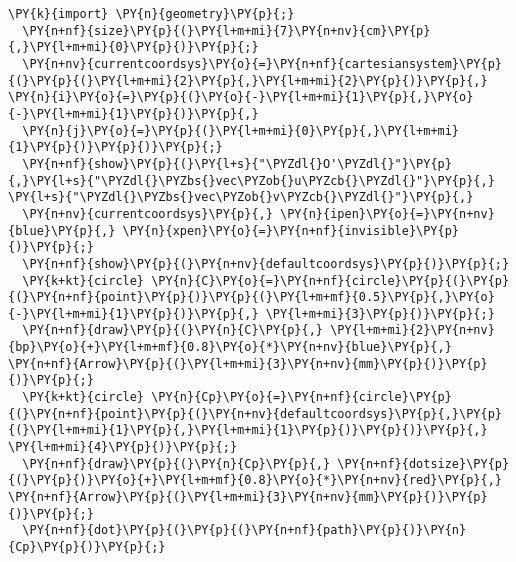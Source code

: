 \begin{Verbatim}[commandchars=\\\{\}]
  \PY{k}{import} \PY{n}{geometry}\PY{p}{;}
  \PY{n+nf}{size}\PY{p}{(}\PY{l+m+mi}{7}\PY{n+nv}{cm}\PY{p}{,}\PY{l+m+mi}{0}\PY{p}{)}\PY{p}{;}
  \PY{n+nv}{currentcoordsys}\PY{o}{=}\PY{n+nf}{cartesiansystem}\PY{p}{(}\PY{p}{(}\PY{l+m+mi}{2}\PY{p}{,}\PY{l+m+mi}{2}\PY{p}{)}\PY{p}{,} \PY{n}{i}\PY{o}{=}\PY{p}{(}\PY{o}{-}\PY{l+m+mi}{1}\PY{p}{,}\PY{o}{-}\PY{l+m+mi}{1}\PY{p}{)}\PY{p}{,}
  \PY{n}{j}\PY{o}{=}\PY{p}{(}\PY{l+m+mi}{0}\PY{p}{,}\PY{l+m+mi}{1}\PY{p}{)}\PY{p}{)}\PY{p}{;}
  \PY{n+nf}{show}\PY{p}{(}\PY{l+s}{"\PYZdl{}O'\PYZdl{}"}\PY{p}{,}\PY{l+s}{"\PYZdl{}\PYZbs{}vec\PYZob{}u\PYZcb{}\PYZdl{}"}\PY{p}{,} \PY{l+s}{"\PYZdl{}\PYZbs{}vec\PYZob{}v\PYZcb{}\PYZdl{}"}\PY{p}{,}
  \PY{n+nv}{currentcoordsys}\PY{p}{,} \PY{n}{ipen}\PY{o}{=}\PY{n+nv}{blue}\PY{p}{,} \PY{n}{xpen}\PY{o}{=}\PY{n+nf}{invisible}\PY{p}{)}\PY{p}{;}
  \PY{n+nf}{show}\PY{p}{(}\PY{n+nv}{defaultcoordsys}\PY{p}{)}\PY{p}{;}
  \PY{k+kt}{circle} \PY{n}{C}\PY{o}{=}\PY{n+nf}{circle}\PY{p}{(}\PY{p}{(}\PY{n+nf}{point}\PY{p}{)}\PY{p}{(}\PY{l+m+mf}{0.5}\PY{p}{,}\PY{o}{-}\PY{l+m+mi}{1}\PY{p}{)}\PY{p}{,} \PY{l+m+mi}{3}\PY{p}{)}\PY{p}{;}
  \PY{n+nf}{draw}\PY{p}{(}\PY{n}{C}\PY{p}{,} \PY{l+m+mi}{2}\PY{n+nv}{bp}\PY{o}{+}\PY{l+m+mf}{0.8}\PY{o}{*}\PY{n+nv}{blue}\PY{p}{,} \PY{n+nf}{Arrow}\PY{p}{(}\PY{l+m+mi}{3}\PY{n+nv}{mm}\PY{p}{)}\PY{p}{)}\PY{p}{;}
  \PY{k+kt}{circle} \PY{n}{Cp}\PY{o}{=}\PY{n+nf}{circle}\PY{p}{(}\PY{n+nf}{point}\PY{p}{(}\PY{n+nv}{defaultcoordsys}\PY{p}{,}\PY{p}{(}\PY{l+m+mi}{1}\PY{p}{,}\PY{l+m+mi}{1}\PY{p}{)}\PY{p}{)}\PY{p}{,} \PY{l+m+mi}{4}\PY{p}{)}\PY{p}{;}
  \PY{n+nf}{draw}\PY{p}{(}\PY{n}{Cp}\PY{p}{,} \PY{n+nf}{dotsize}\PY{p}{(}\PY{p}{)}\PY{o}{+}\PY{l+m+mf}{0.8}\PY{o}{*}\PY{n+nv}{red}\PY{p}{,} \PY{n+nf}{Arrow}\PY{p}{(}\PY{l+m+mi}{3}\PY{n+nv}{mm}\PY{p}{)}\PY{p}{)}\PY{p}{;}
  \PY{n+nf}{dot}\PY{p}{(}\PY{p}{(}\PY{n+nf}{path}\PY{p}{)}\PY{n}{Cp}\PY{p}{)}\PY{p}{;}
\end{Verbatim}
